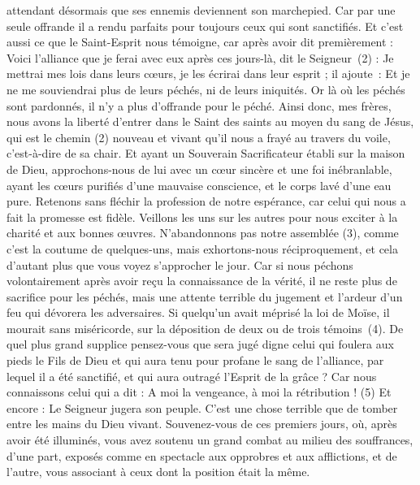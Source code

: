 \begin{multicols}{2}
attendant désormais que ses ennemis deviennent son marchepied.
Car par une seule offrande il a rendu parfaits pour toujours ceux qui sont sanctifiés.
Et c'est aussi ce que le Saint-Esprit nous témoigne, car après avoir dit premièrement :
Voici l'alliance que je ferai avec eux après ces jours-là, dit le Seigneur (2) : Je mettrai mes lois dans leurs cœurs, je les écrirai dans leur esprit ; il ajoute :
Et je ne me souviendrai plus de leurs péchés, ni de leurs iniquités.
Or là où les péchés sont pardonnés, il n'y a plus d’offrande pour le péché.
Ainsi donc, mes frères, nous avons la liberté d'entrer dans le Saint des saints au moyen du sang de Jésus,
qui est le chemin (2) nouveau et vivant qu'il nous a frayé au travers du voile, c’est-à-dire de sa chair.
Et ayant un Souverain Sacrificateur établi sur la maison de Dieu,
approchons-nous de lui avec un cœur sincère et une foi inébranlable, ayant les cœurs purifiés d’une mauvaise conscience, et le corps lavé d’une eau pure.
Retenons sans fléchir la profession de notre espérance, car celui qui nous a fait la promesse est fidèle.
Veillons les uns sur les autres pour nous exciter à la charité et aux bonnes œuvres.
N’abandonnons pas notre assemblée (3), comme c’est la coutume de quelques-uns, mais exhortons-nous réciproquement, et cela d'autant plus que vous voyez s’approcher le jour.
Car si nous péchons volontairement après avoir reçu la connaissance de la vérité, il ne reste plus de sacrifice pour les péchés,
mais une attente terrible du jugement et l'ardeur d'un feu qui dévorera les adversaires.
Si quelqu'un avait méprisé la loi de Moïse, il mourait sans miséricorde, sur la déposition de deux ou de trois témoins (4).
De quel plus grand supplice pensez-vous que sera jugé digne celui qui foulera aux pieds le Fils de Dieu et qui aura tenu pour profane le sang de l'alliance, par lequel il a été sanctifié, et qui aura outragé l'Esprit de la grâce ?
Car nous connaissons celui qui a dit : A moi la vengeance, à moi la rétribution ! (5) Et encore : Le Seigneur jugera son peuple.
C'est une chose terrible que de tomber entre les mains du Dieu vivant.
Souvenez-vous de ces premiers jours, où, après avoir été illuminés, vous avez soutenu un grand combat au milieu des souffrances,
d'une part, exposés comme en spectacle aux opprobres et aux afflictions, et de l'autre, vous associant à ceux dont la position était la même.

\end{multicols}
